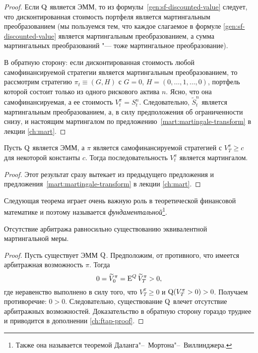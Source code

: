 \begin{proof}
Если $\mathrm{Q}$ является ЭММ, то из  формулы~\eqref{gen:sf-discounted-value} следует, что дисконтированная стоимость портфеля является мартингальным преобразованием (мы пользуемся тем, что каждое слагаемое в формуле \eqref{gen:sf-discounted-value} является мартингальным преобразованием, а сумма мартингальных преобразований "--- тоже мартингальное преобразование).

В обратную сторону: если дисконтированная стоимость любой самофинансируемой стратегии является мартингальным преобразованием, то рассмотрим стратегию $\pi_t \equiv (G,H)$ с $G=0$, $H=(0,\dots,1,\dots,0)$, портфель которой состоит только из одного рискового актива $n$. Ясно, что она самофинансируемая, а ее стоимость $V_t^\pi = S_t^n$. Следовательно, $\tilde S_t^n$ является мартингальным преобразованием, а, в силу предположения об ограниченности снизу, и настоящим мартингалом по предложению~\ref{mart:martingale-transform} в лекции \ref{ch:mart}.
\end{proof}

\begin{corollary}
Пусть $\mathrm{Q}$ является ЭММ, а $\pi$ является самофинансируемой стратегией с $V_T^\pi \ge c$ для некоторой константы $c$. Тогда последовательность $V_t^\pi$ является мартингалом.
\end{corollary}

\begin{proof}
Этот результат сразу вытекает из предыдущего предложения и предложения~\ref{mart:martingale-transform} в лекции \ref{ch:mart}.
\end{proof}

Следующая теорема играет очень важную роль в теоретической финансовой математике и поэтому называется \emph{фундаментальной}\footnote{Также она называется теоремой Даланга"--~Мортона"--~Виллинджера.}.

\begin{theorem}
Отсутствие арбитража равносильно существованию эквивалентной мартингальной меры.
\end{theorem}
\begin{proof}
Пусть существует ЭММ $\mathrm{Q}$. Предположим, от противного, что имеется арбитражная возможность $\pi$. Тогда
\[
0 = \widetilde V_0^\pi = \operatorname{E}^Q \widetilde V_T^\pi > 0,
\]
где неравенство выполнено в силу того, что $V_T^\pi \ge 0$ и $\mathrm{Q}(V_T^\pi>0)>0$.
Получаем противоречие: $0>0$.
Следовательно, существование $\mathrm{Q}$ влечет отсутствие арбитражных возможностей. 
Доказательство в обратную сторону гораздо труднее и приводится в дополнении \ref{ch:ftap-proof}.
\end{proof}

